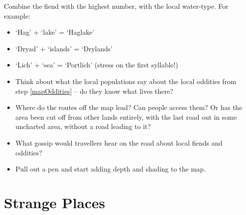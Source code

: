 \begin{multicols}{2}

Combine the fiend with the highest number, with the local water-type.
For example:

\begin{itemize}
\item
  `Hag' + `lake' = `Haglake'
\item
  `Dryad' + `islands' = `Drylands'
\item
  `Lich' + `sea' = `Portlich' (stress on the first syllable!)
\end{itemize}


\begin{itemize}
  \item
  Think about what the local populations say about the local oddities from step \ref{mapOddities} -- do they know what lives there?
  \item
  Where do the routes off the map lead?
  Can people access them?
  Or has the area been cut off from other lands entirely, with the last road out in some uncharted area, without a road leading to it?
  \item
  What gossip would travellers hear on the road about local fiends and oddities?
  \item
  Pull out a pen and start adding depth and shading to the map.
\end{itemize}

\end{multicols}

\section{Strange Places}

